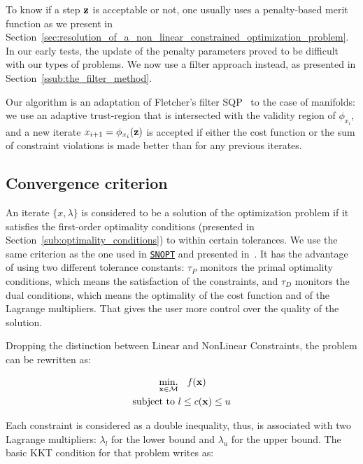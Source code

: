 To know if a step ${\bf z}$ is acceptable or not, one usually uses a penalty-based merit function as we present in Section~\ref{sec:resolution_of_a_non_linear_constrained_optimization_problem}.
In our early tests, the update of the penalty parameters proved to be difficult with our types of problems.
We now use a filter approach instead, as presented in Section~\ref{ssub:the_filter_method}.

Our algorithm is an adaptation of Fletcher's filter SQP~\cite{fletcher:mathprog:2000} to the case of manifolds: we use an adaptive trust-region that is intersected with the validity region of $\phi_{x_i}$, and a new iterate $x_{i+1} = \phi_{x_i}({\bf z})$ is accepted if either the cost function or the sum of constraint violations is made better than for any previous iterates.

\subsection{Convergence criterion}
\label{sub:convergence_criterion}

An iterate $\{x,\lambda\}$ is considered to be a solution of the optimization problem if it satisfies the first-order optimality conditions (presented in Section~\ref{sub:optimality_conditions}) to within certain tolerances.
We use the same criterion as the one used in \href{http://www.sbsi-sol-optimize.com/asp/sol_product_snopt.htm}{{\tt SNOPT}} and presented in~\cite{gill:snopt:2002}.
It has the advantage of using two different tolerance constants: $\tau_P$ monitors the primal optimality conditions, which means the satisfaction of the constraints, and $\tau_D$ monitors the dual conditions, which means the optimality of the cost function and of the Lagrange multipliers.
That gives the user more control over the quality of the solution.

Dropping the distinction between Linear and NonLinear Constraints,
the problem can be rewritten as:

\begin{align}
\begin{split}
\label{eq:problem}
  \operatorname*{min.}_{\bf x \in \mathcal{M}} & \quad \mbox{\emph{f}}({\bf x}) \\
  \text{subject to }&
  l \leq c({\bf x}) \leq u \\
\end{split}
\end{align}

Each constraint is considered as a double inequality, thus, is associated with two Lagrange multipliers: $\lambda_l$ for the lower bound and $\lambda_u$ for the upper bound.
The basic KKT condition for that problem writes as:

